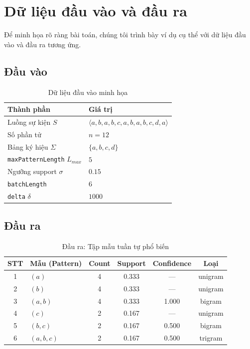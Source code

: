 \documentclass[a4paper,12pt]{report}
\begin{document}
\section{Dữ liệu đầu vào và đầu ra}
\label{sec:io}

Để minh họa rõ ràng bài toán, chúng tôi trình bày ví dụ cụ thể với dữ liệu đầu vào và đầu ra tương ứng.

\subsection{Đầu vào}

\begin{table}[H]
    \centering
    \caption{Dữ liệu đầu vào minh họa}
    \label{tab:input}
    \begin{tabular}{ll}
        \toprule
        \textbf{Thành phần} & \textbf{Giá trị} \\
        \midrule
        Luồng sự kiện $S$ & $\langle a, b, a, b, c, a, b, a, b, c, d, a \rangle$ \\
        Số phần tử & $n = 12$ \\
        Bảng ký hiệu $\Sigma$ & $\{a, b, c, d\}$ \\
        \texttt{maxPatternLength} $L_{max}$ & $5$ \\
        Ngưỡng support $\sigma$ & $0.15$ \\
        \texttt{batchLength} & $6$ \\
        \texttt{delta} $\delta$ & $1000$ \\
        \bottomrule
    \end{tabular}
\end{table}

\subsection{Đầu ra}

\begin{table}[H]
    \centering
    \caption{Đầu ra: Tập mẫu tuần tự phổ biến}
    \label{tab:output}
    \begin{tabular}{clcccc}
        \toprule
        \textbf{STT} & \textbf{Mẫu (Pattern)} & \textbf{Count} & \textbf{Support} & \textbf{Confidence} & \textbf{Loại} \\
        \midrule
        1 & $(a)$        & 4 & 0.333 & ---   & unigram \\
        2 & $(b)$        & 4 & 0.333 & ---   & unigram \\
        3 & $(a, b)$     & 4 & 0.333 & 1.000 & bigram \\
        4 & $(c)$        & 2 & 0.167 & ---   & unigram \\
        5 & $(b, c)$     & 2 & 0.167 & 0.500 & bigram \\
        6 & $(a, b, c)$  & 2 & 0.167 & 0.500 & trigram \\
        \bottomrule
    \end{tabular}
\end{table}
\end{document}
